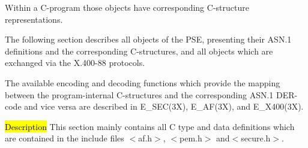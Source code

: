Within a C-program those objects have corresponding C-structure 
representations.

The following section describes all objects of the PSE, presenting their 
ASN.1 definitions
and the corresponding C-structures, and all objects which are exchanged via 
the X.400-88
protocols.

The available encoding and decoding functions which provide the mapping 
between the 
program-internal C-structures and the corresponding ASN.1 DER-code and vice 
versa are described
in E\_SEC(3X), E\_AF(3X), and E\_X400(3X).

\label{intro5}
\hl{Description}
This section mainly contains all C type and data definitions which are 
contained
in the include files $<$af.h$>$, $<$pem.h$>$ and$<$secure.h$>$.

